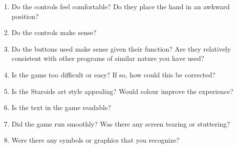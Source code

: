 \documentclass[12pt, titlepage]{article}
\begin{document}
\begin{enumerate}

  \item Do the controls feel comfortable? Do they place the hand in an awkward position?
  \item Do the controls make sense?
  \item Do the buttons used make sense given their function? Are they relatively consistent with other programs of similar nature you have used?
  \item Is the game too difficult or easy? If so, how could this be corrected?
  \item Is the Staroids art style appealing? Would colour improve the experience?
  \item Is the text in the game readable?
  \item Did the game run smoothly? Was there any screen tearing or stuttering?
  \item Were there any symbols or graphics that you recognize?

\end{enumerate}
\end{document}
